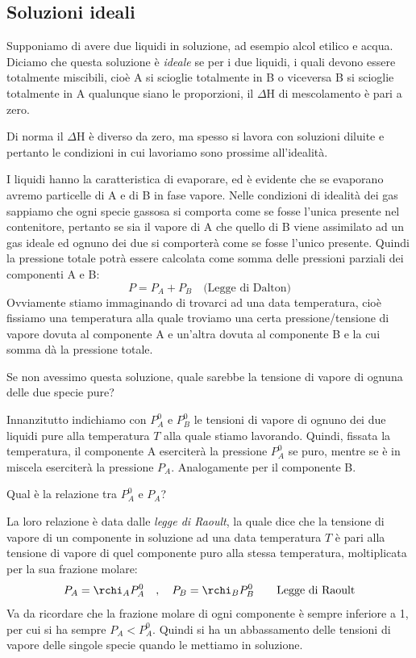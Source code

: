 \subsection{Soluzioni ideali}
Supponiamo di avere due liquidi in soluzione, ad esempio alcol etilico e acqua. Diciamo che questa soluzione è \textit{ideale} se per i due liquidi, i quali devono essere totalmente miscibili, cioè A si scioglie totalmente in B o viceversa B si scioglie totalmente in A qualunque siano le proporzioni, il $\Delta$H di mescolamento è pari a zero.

Di norma il $\Delta$H è diverso da zero, ma spesso si lavora con soluzioni diluite e pertanto le condizioni in cui lavoriamo sono prossime all'idealità.

\vspace{0.2cm}I liquidi hanno la caratteristica di evaporare, ed è evidente che se evaporano avremo particelle di A e di B in fase vapore. Nelle condizioni di idealità dei gas sappiamo che ogni specie gassosa si comporta come se fosse l'unica presente nel contenitore, pertanto se sia il vapore di A che quello di B viene assimilato ad un gas ideale ed ognuno dei due si comporterà come se fosse l'unico presente. Quindi la pressione totale potrà essere calcolata come somma delle pressioni parziali dei componenti A e B:
$$P=P_A + P_B \quad \text{(Legge di Dalton)}$$
Ovviamente stiamo immaginando di trovarci ad una data temperatura, cioè fissiamo una temperatura alla quale troviamo una certa pressione/tensione di vapore dovuta al componente A e un'altra dovuta al componente B e la cui somma dà la pressione totale.

Se non avessimo questa soluzione, quale sarebbe la tensione di vapore di ognuna delle due specie pure? 

Innanzitutto indichiamo con $P^0_A$ e $P^0_B$ le tensioni di vapore di ognuno dei due liquidi pure alla temperatura $T$ alla quale stiamo lavorando. Quindi, fissata la temperatura, il componente A eserciterà la pressione $P^0_A$ se puro, mentre se è in miscela eserciterà la pressione $P_A$. Analogamente per il componente B.

Qual è la relazione tra $P^0_A$ e $P_A$?

La loro relazione è data dalle \textit{legge di Raoult}, la quale dice che la tensione di vapore di un componente in soluzione ad una data temperatura $T$ è pari alla tensione di vapore di quel componente puro alla stessa temperatura, moltiplicata per la sua frazione molare:
$$P_A=\rchi_A P^0_A
\quad,\quad P_B=\rchi_B P^0_B \qquad \text{Legge di Raoult}$$
Va da ricordare che la frazione molare di ogni componente è sempre inferiore a 1, per cui si ha sempre $P_A < P^0_A$. Quindi si ha un abbassamento delle tensioni di vapore delle singole specie quando le mettiamo in soluzione.

